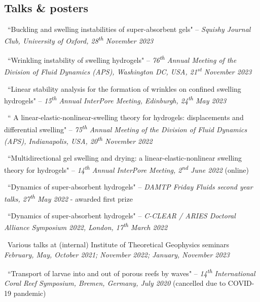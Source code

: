 \documentclass[a4paper]{article}
\begin{document}
    \begin{multicols}{2}
    	\subsection*{Talks \& posters}
            \begin{small}
                \begin{itemize}
                    {\color{gray}\item \faVolumeUp \, ``Buckling and swelling instabilities of super-absorbent gels" -- \emph{Squishy Journal Club, University of Oxford, 28\textsuperscript{th} November 2023}}
                    {\color{gray}\item \faVolumeUp \, ``Wrinkling instability of swelling hydrogels" -- \emph{76\textsuperscript{th} Annual Meeting of the Division of Fluid Dynamics (APS), Washington DC, USA, 21\textsuperscript{st} November 2023}}
                    \item \faVolumeUp \, ``Linear stability analysis for the formation of wrinkles on confined swelling hydrogels" -- \emph{15\textsuperscript{th} Annual InterPore Meeting, Edinburgh, 24\textsuperscript{th} May 2023}
                    \item \faVolumeUp \, `` A linear-elastic-nonlinear-swelling theory for hydrogels: displacements and differential swelling" -- \emph{75\textsuperscript{th} Annual Meeting of the Division of Fluid Dynamics (APS), Indianapolis, USA, 20\textsuperscript{th} November 2022}
                    \item \faVolumeUp \, ``Multidirectional gel swelling and drying: a linear-elastic-nonlinear swelling theory for hydrogels" -- \emph{14\textsuperscript{th} Annual InterPore Meeting, 2\textsuperscript{nd} June 2022} (online)
                    \item \faVolumeUp \, ``Dynamics of super-absorbent hydrogels" -- \emph{DAMTP Friday Fluids second year talks, 27\textsuperscript{th} May 2022} - awarded first prize
                    \item \faClipboard \, ``Dynamics of super-absorbent hydrogels" -- \emph{C-CLEAR / ARIES Doctoral Alliance Symposium 2022, London, 17\textsuperscript{th} March 2022}
                    \item \faVolumeUp \, Various talks at (internal) Institute of Theoretical Geophysics seminars \emph{February, May, October 2021; November 2022; January, November 2023}
                    \item \faVolumeUp \, ``Transport of larvae into and out of porous reefs by waves" -- \emph{14\textsuperscript{th} International Coral Reef Symposium, Bremen, Germany, July 2020} (cancelled due to COVID-19 pandemic)

\end{itemize}
\end{small}
\end{multicols}
\end{document}
